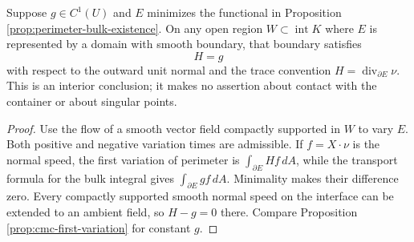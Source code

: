 \begin{proposition}\label{prop:perimeter-bulk-euler}
Suppose $g\in C^1(U)$ and $E$ minimizes the functional in Proposition \ref{prop:perimeter-bulk-existence}. On any open region $W\subset\operatorname{int}K$ where $E$ is represented by a domain with smooth boundary, that boundary satisfies
\[
 H=g
\]
with respect to the outward unit normal and the trace convention $H=\operatorname{div}_{\partial E}\nu$. This is an interior conclusion; it makes no assertion about contact with the container or about singular points.
\end{proposition}
\begin{proof}
Use the flow of a smooth vector field compactly supported in $W$ to vary $E$. Both positive and negative variation times are admissible. If $f=X\cdot\nu$ is the normal speed, the first variation of perimeter is $\int_{\partial E}Hf\,dA$, while the transport formula for the bulk integral gives $\int_{\partial E}gf\,dA$. Minimality makes their difference zero. Every compactly supported smooth normal speed on the interface can be extended to an ambient field, so $H-g=0$ there. Compare Proposition \ref{prop:cmc-first-variation} for constant $g$.
\end{proof}
